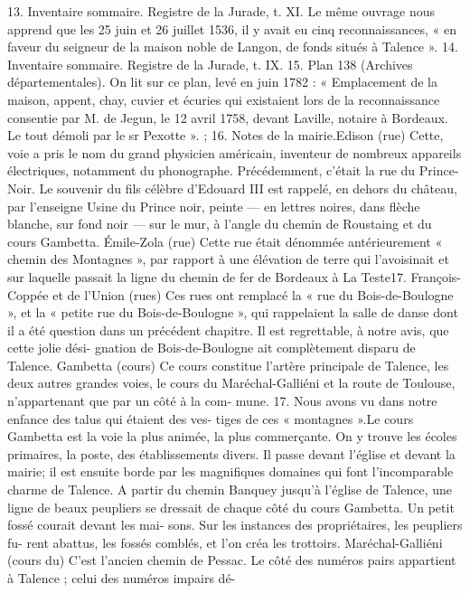 \documentclass[a4paper,11pt]{book}
\begin{document}
13. Inventaire sommaire. Registre de la Jurade, t. XI.
Le même ouvrage nous apprend que les 25 juin et 26 juillet 1536, il y
avait eu cinq reconnaissances, « en faveur du seigneur de la maison
noble de Langon, de fonds situés à Talence ».
14. Inventaire sommaire. Registre de la Jurade, t. IX.
15. Plan 138 (Archives départementales). On lit sur ce plan, levé en
juin 1782 : « Emplacement de la maison, appent, chay, cuvier et écuries
qui existaient lors de la reconnaissance consentie par M. de Jegun, le
12 avril 1758, devant Laville, notaire à Bordeaux. Le tout démoli par le
sr Pexotte ».
;
16. Notes de la mairie.Edison (rue)
Cette, voie a pris le nom du grand physicien américain,
inventeur de nombreux appareils électriques, notamment
du phonographe. Précédemment, c'était la rue du Prince-
Noir.
Le souvenir du fils célèbre d'Edouard III est rappelé,
en dehors du château, par l'enseigne Usine du Prince noir,
peinte — en lettres noires, dans flèche blanche, sur fond
noir — sur le mur, à l'angle du chemin de Roustaing et du
cours Gambetta.
Émile-Zola (rue)
Cette rue était dénommée antérieurement « chemin des
Montagnes », par rapport à une élévation de terre qui
l'avoisinait et sur laquelle passait la ligne du chemin de fer
de Bordeaux à La Teste17.
François-Coppée et de l'Union (rues)
Ces rues ont remplacé la « rue du Bois-de-Boulogne »,
et la « petite rue du Bois-de-Boulogne », qui rappelaient
la salle de danse dont il a été question dans un précédent
chapitre. Il est regrettable, à notre avis, que cette jolie dési-
gnation de Bois-de-Boulogne ait complètement disparu de
Talence.
Gambetta (cours)
Ce cours constitue l'artère principale de Talence, les deux
autres grandes voies, le cours du Maréchal-Galliéni et la
route de Toulouse, n'appartenant que par un côté à la com-
mune.
17. Nous avons vu dans notre enfance des talus qui étaient des ves-
tiges de ces « montagnes ».Le cours Gambetta est la voie la plus animée, la plus
commerçante. On y trouve les écoles primaires, la poste,
des établissements divers. Il passe devant l'église et devant
la mairie; il est ensuite borde par les magnifiques domaines
qui font l'incomparable charme de Talence.
A partir du chemin Banquey jusqu'à l'église de Talence,
une ligne de beaux peupliers se dressait de chaque côté
du cours Gambetta. Un petit fossé courait devant les mai-
sons. Sur les instances des propriétaires, les peupliers fu-
rent abattus, les fossés comblés, et l'on créa les trottoirs.
Maréchal-Galliéni (cours du)
C'est l'ancien chemin de Pessac. Le côté des numéros
pairs appartient à Talence ; celui des numéros impairs dé-
\end{document}
